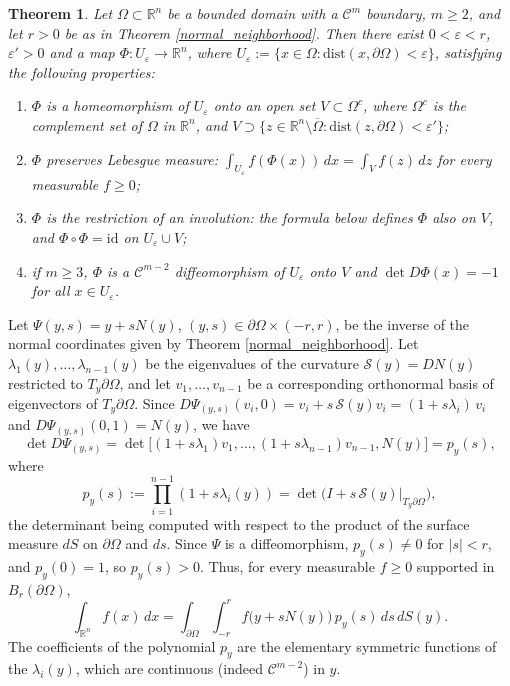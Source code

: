 \documentclass[10pt,a4paper]{amsart}
\theoremstyle{plain}
\newtheorem{theorem}{Theorem}
\renewcommand{\proof}{{\noindent \bf Proof. \ }}
\newcommand{\R}{\mathbb{R}}
\newcommand{\dist}{\textrm{dist}}
\begin{document}
\begin{theorem} \label{area_preserving} Let $ \Omega \subset \R^n$ be a {bounded} domain with a $\mathcal{C}^m$ boundary, $ m \geq 2$,
{and let $r>0$ be as in Theorem \ref{normal_neighborhood}. Then there exist $0 < \varepsilon < r$, $\varepsilon' > 0$ and a map
$\Phi : U_\varepsilon \to \R^n$, where $U_\varepsilon := \{x \in \Omega : \dist(x,\partial\Omega) < \varepsilon\}$,
satisfying the following properties:}
 \begin{enumerate}
  \item {$\Phi$ is a homeomorphism of $U_\varepsilon$ onto an open set $V \subset \Omega^c$}{, where $\Omega^c$ is the complement set of $\Omega$ in $\R^n$}, {and $V \supset \{ z \in \R^n \setminus \overline\Omega : \dist(z,\partial\Omega) < \varepsilon'\}$;}
  \item {$\Phi$ preserves Lebesgue measure: $\int_{U_\varepsilon} f(\Phi(x))\,dx = \int_V f(z)\,dz$ for every measurable $f \geq 0$;}
  \item {$\Phi$ is the restriction of an involution: the formula below defines $\Phi$ also on $V$, and $\Phi\circ\Phi = \mathrm{id}$ on $U_\varepsilon \cup V$;}
  \item {if $m \geq 3$, $\Phi$ is a $\mathcal{C}^{m-2}$ diffeomorphism of $U_\varepsilon$ onto $V$ and $\det D\Phi (x) = -1$ for all $x \in U_\varepsilon$.}
  \end{enumerate}
\end{theorem}

\noindent \proof
{Let $\Psi(y,s) = y + sN(y)$, $(y,s) \in \partial\Omega\times(-r,r)$, be the inverse of the normal coordinates given by Theorem \ref{normal_neighborhood}.
Let $\lambda_1(y), \dots, \lambda_{n-1}(y)$ be the eigenvalues of the curvature $\mathcal{S}(y) = DN(y)$ restricted to $T_y\partial\Omega$, and let
$v_1, \dots, v_{n-1}$ be a corresponding orthonormal basis of eigenvectors of $T_y\partial\Omega$.
Since $D\Psi_{(y,s)}(v_i,0) = v_i + s\,\mathcal{S}(y) v_i = (1+s\lambda_i)\, v_i$ and $D\Psi_{(y,s)}(0,1) = N(y)$, we have
\[
 \det D\Psi_{(y,s)} = \det\big[(1+s\lambda_1)v_1, \dots, (1+s\lambda_{n-1})v_{n-1}, N(y)\big] = p_y(s),
\]
where
\[ p_y(s) := \prod_{i=1}^{n-1}(1+s\lambda_i(y)) = \det\big(I + s\,\mathcal{S}(y)\big|_{T_y\partial\Omega}\big),\]
the determinant being computed with respect to the product of the surface measure $dS$ on $\partial\Omega$ and $ds$. Since $\Psi$ is a diffeomorphism, $p_y(s) \neq 0$ for $|s| < r$, and $p_y(0) = 1$, so $p_y(s) > 0$. Thus, for every measurable $f \geq 0$ supported in $B_r(\partial\Omega)$,
\begin{equation}\label{normal_coord_integral}
 \int_{\R^n} f(x)\, dx = \int_{\partial\Omega}\int_{-r}^{r} f\big(y + sN(y)\big)\, p_y(s)\, ds\, dS(y).
\end{equation}
The coefficients of the polynomial $p_y$ are the elementary symmetric functions of the $\lambda_i(y)$, which are continuous (indeed $\mathcal{C}^{m-2}$) in $y$.}
\end{document}
